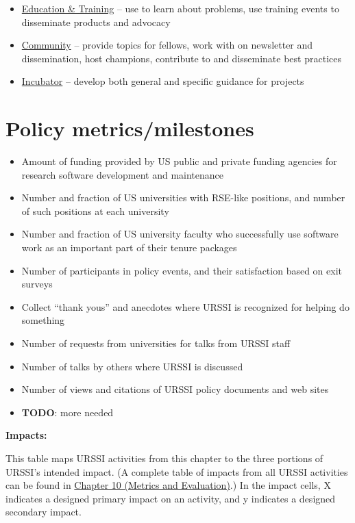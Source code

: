 \documentclass[
]{book}
\begin{document}
\begin{itemize}
\item
  \protect\hyperlink{Ch-Edu}{Education \& Training} -- use to learn about problems, use training events to disseminate products and advocacy
\item
  \protect\hyperlink{Ch-Comm}{Community} -- provide topics for fellows, work with on newsletter and dissemination, host champions,
  contribute to and disseminate best practices
\item
  \protect\hyperlink{Ch-Incubator}{Incubator} -- develop both general and specific guidance for projects
\end{itemize}

\hypertarget{policy-metricsmilestones}{%
\section{Policy metrics/milestones}\label{policy-metricsmilestones}}

\begin{itemize}
\item
  Amount of funding provided by US public and private funding agencies for research software
  development and maintenance
\item
  Number and fraction of US universities with RSE-like positions, and number of such positions at each university
\item
  Number and fraction of US university faculty who successfully use software work as an important part of
  their tenure packages
\item
  Number of participants in policy events, and their satisfaction based on exit surveys
\item
  Collect ``thank yous'' and anecdotes where URSSI is recognized for helping do something
\item
  Number of requests from universities for talks from URSSI staff
\item
  Number of talks by others where URSSI is discussed
\item
  Number of views and citations of URSSI policy documents and web sites
\item
  \textbf{TODO}: more needed
\end{itemize}

\textbf{Impacts:}

This table maps URSSI activities from this chapter to the three portions of URSSI's intended impact.
(A complete table of impacts from all URSSI activities can be found in \href{Ch-Metrics}{Chapter 10 (Metrics and Evaluation)}.)
In the impact cells, X indicates a designed primary impact on an activity, and y indicates
a designed secondary impact.
\end{document}

